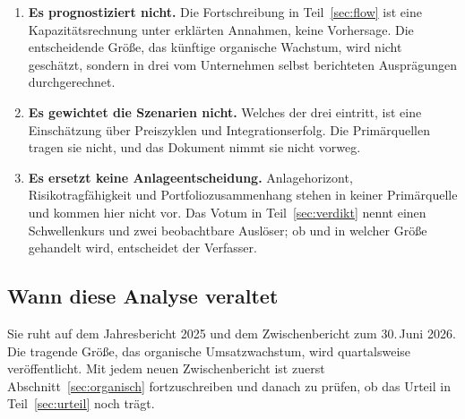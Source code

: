 \begin{enumerate}
\item \textbf{Es prognostiziert nicht.} Die Fortschreibung in Teil~\ref{sec:flow}
ist eine Kapazit\"atsrechnung unter erkl\"arten Annahmen, keine Vorhersage. Die
entscheidende Gr\"o{\ss}e, das k\"unftige organische Wachstum, wird nicht
gesch\"atzt, sondern in drei vom Unternehmen selbst berichteten Auspr\"agungen
durchgerechnet.
\item \textbf{Es gewichtet die Szenarien nicht.} Welches der drei eintritt, ist
eine Einsch\"atzung \"uber Preiszyklen und Integrationserfolg. Die
Prim\"arquellen tragen sie nicht, und das Dokument nimmt sie nicht vorweg.
\item \textbf{Es ersetzt keine Anlageentscheidung.} Anlagehorizont,
Risikotragf\"ahigkeit und Portfoliozusammenhang stehen in keiner
Prim\"arquelle und kommen hier nicht vor. Das Votum in
Teil~\ref{sec:verdikt} nennt einen Schwellenkurs und zwei beobachtbare
Ausl\"oser; ob und in welcher Gr\"o{\ss}e gehandelt wird, entscheidet der
Verfasser.
\end{enumerate}

\subsection*{Wann diese Analyse veraltet}

Sie ruht auf dem Jahresbericht 2025 und dem Zwischenbericht zum
30.\,Juni 2026. Die tragende Gr\"o{\ss}e, das organische Umsatzwachstum, wird
quartalsweise ver\"offentlicht. Mit jedem neuen Zwischenbericht ist zuerst
Abschnitt~\ref{sec:organisch} fortzuschreiben und danach zu pr\"ufen, ob das
Urteil in Teil~\ref{sec:urteil} noch tr\"agt.
